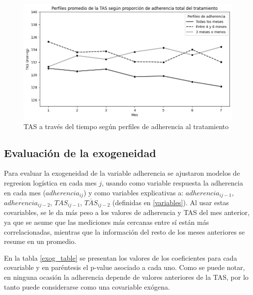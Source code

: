\documentclass[spanish]{article}
\numberwithin{figure}{subsection}
\numberwithin{equation}{subsection}
\numberwithin{table}{subsection}
\begin{document}
\begin{figure}[H]
	\centering
	\includegraphics[scale=0.5]{img/TAS_vs_tpo_with_adherencia.png}
	\caption{TAS a través del tiempo según perfiles de adherencia al tratamiento}
	\label{TAS_with_adh}
\end{figure}

\subsection{Evaluación de la exogeneidad}

Para evaluar la exogeneidad de la variable adherencia se ajustaron modelos de
regresion logística en cada mes $j$, usando como variable respuesta la
adherencia en cada mes ($adherencia_{ij}$) y como variables explicativas a:
$adherencia_{ij-1}$, $\overline{adherencia}_{ij-2}$, $TAS_{ij-1}$,
$\overline{TAS}_{ij-2}$ (definidas en \ref{variables}). Al usar estas
covariables, se le da más peso a los valores de adherencia y TAS del mes
anterior, ya que se asume que las mediciones más cercanas entre sí están más
correlacionadas, mientras que la información del resto de los meses anteriores
se resume en un promedio.

En la tabla \ref{exog_table} se presentan los valores de los coeficientes para
cada covariable y en paréntesis el p-value asociado a cada uno. Como se puede
notar, en ninguna ocasión la adherencia depende de valores anteriores de la TAS,
por lo tanto puede considerarse como una covariable exógena.
\end{document}

